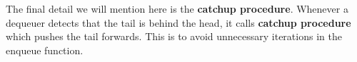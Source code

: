 \documentclass{article}      %
\begin{document}
The final detail we will mention here is the \textbf{catchup procedure}. Whenever a dequeuer detects that the tail is behind the head, it calls \textbf{catchup procedure} which pushes the tail forwards. This is to avoid unnecessary iterations in the enqueue function. 



\end{document}
